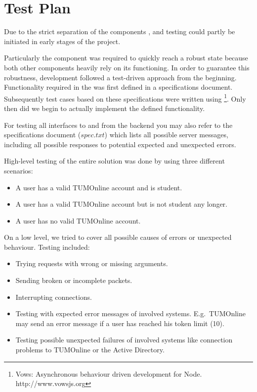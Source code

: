 \section{Test Plan}\label{sec:test_plan}



Due to the strict separation of the components \be, \ph and \ter testing could partly be initiated in early stages of the project.

Particularly the \be component was required to quickly reach a robust state because both other components heavily rely on its functioning.
In order to guarantee this robustness, development followed a test-driven approach from the beginning.
Functionality required in the \be was first defined in a specifications document.
Subsequently test cases based on these specifications were written using \vows\footnote{Vows: Asynchronous behaviour driven development for Node. http://www.vowsjs.org}.
Only then did we begin to actually implement the defined functionality.

\medskip

\noindent
For testing all interfaces to and from the backend you may also refer to the specifications document ($spec.txt$) which lists all possible server messages, including all possible responses to potential expected and unexpected errors.

\bigskip

\noindent
High-level testing of the entire \app solution was done by using three different scenarios:
\begin{itemize}
\item A user has a valid TUMOnline account and is student.
\item A user has a valid TUMOnline account but is not student any longer.
\item A user has no valid TUMOnline account.
\end{itemize}

\noindent
On a low level, we tried to cover all possible causes of errors or unexpected behaviour.
Testing included:
\begin{itemize}
\item Trying requests with wrong or missing arguments.
\item Sending broken or incomplete packets.
\item Interrupting connections.
\item Testing with expected error messages of involved systems.
E.g.~TUMOnline may send an error message if a user has reached his token limit (10).
\item Testing possible unexpected failures of involved systems like connection problems to TUMOnline or the Active Directory.
\end{itemize}


